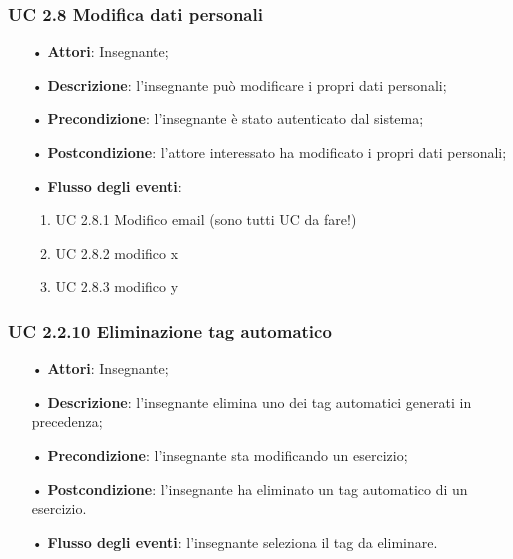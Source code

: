 \subsubsection{UC 2.8 Modifica dati personali}
\begin{itemize}
	\item[•] \textbf{Attori}: Insegnante;
	\item[•] \textbf{Descrizione}: l'insegnante può modificare i propri dati personali;
	\item[•] \textbf{Precondizione}: l'insegnante è stato autenticato dal sistema;
	\item[•] \textbf{Postcondizione}: l'attore interessato ha modificato i propri dati personali;
	\item[•] \textbf{Flusso degli eventi}:
	\begin{enumerate}
		\item UC 2.8.1 Modifico email (sono tutti UC da fare!)
		\item UC 2.8.2 modifico x
		\item UC 2.8.3 modifico y
	\end{enumerate}
\end{itemize}

\subsubsection{UC 2.2.10 Eliminazione tag automatico}
\begin{itemize}
	\item[•] \textbf{Attori}: Insegnante;
	\item[•] \textbf{Descrizione}: l'insegnante elimina uno dei tag automatici generati in precedenza;
	\item[•] \textbf{Precondizione}: l'insegnante sta modificando un esercizio;
	\item[•] \textbf{Postcondizione}: l'insegnante ha eliminato un tag automatico di un esercizio.
	\item[•] \textbf{Flusso degli eventi}: l'insegnante seleziona il tag da eliminare.
\end{itemize}